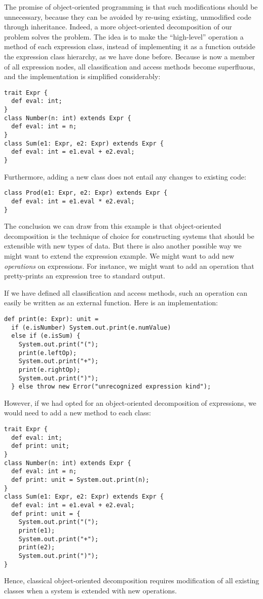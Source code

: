 \documentclass[a4paper,12pt,twoside,titlepage]{book}
\begin{document}
The promise of object-oriented programming is that such modifications
should be unnecessary, because they can be avoided by re-using
existing, unmodified code through inheritance. Indeed, a more
object-oriented decomposition of our problem solves the problem.  The
idea is to make the ``high-level'' operation  a method of
each expression class, instead of implementing it as a function
outside the expression class hierarchy, as we have done
before. Because  is now a member of all expression nodes,
all classification and access methods become superfluous, and the implementation is simplified considerably:
\begin{lstlisting}
trait Expr {
  def eval: int;
}
class Number(n: int) extends Expr {
  def eval: int = n;
}
class Sum(e1: Expr, e2: Expr) extends Expr {
  def eval: int = e1.eval + e2.eval;
}
\end{lstlisting}
Furthermore, adding a new  class does not entail any changes to existing code:
\begin{lstlisting}
class Prod(e1: Expr, e2: Expr) extends Expr {
  def eval: int = e1.eval * e2.eval;
}
\end{lstlisting}

The conclusion we can draw from this example is that object-oriented
decomposition is the technique of choice for constructing systems that
should be extensible with new types of data. But there is also another
possible way we might want to extend the expression example. We might
want to add new {\em operations} on expressions.  For instance, we might
want to add an operation that pretty-prints an expression tree to standard output.

If we have defined all classification and access methods, such an
operation can easily be written as an external function. Here is an
implementation:
\begin{lstlisting}
def print(e: Expr): unit = 
  if (e.isNumber) System.out.print(e.numValue)
  else if (e.isSum) {
    System.out.print("("); 
    print(e.leftOp); 
    System.out.print("+");
    print(e.rightOp);
    System.out.print(")");
  } else throw new Error("unrecognized expression kind");
\end{lstlisting}
However, if we had opted for an object-oriented decomposition of
expressions, we would need to add a new  method
to each class:
\begin{lstlisting}
trait Expr {
  def eval: int;
  def print: unit;
}
class Number(n: int) extends Expr {
  def eval: int = n;
  def print: unit = System.out.print(n);
}
class Sum(e1: Expr, e2: Expr) extends Expr {
  def eval: int = e1.eval + e2.eval;
  def print: unit = {
    System.out.print("("); 
    print(e1); 
    System.out.print("+");
    print(e2);
    System.out.print(")");
}
\end{lstlisting}
Hence, classical object-oriented decomposition requires modification
of all existing classes when a system is extended with new operations.
\end{document}
